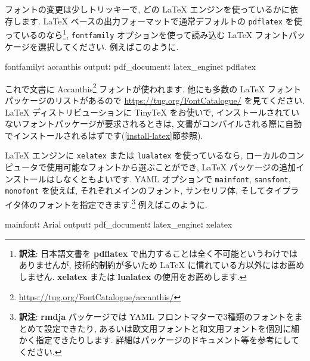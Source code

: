 \documentclass[
  11pt,
  lualatex,
  ja=standard]{bxjsreport}
\newenvironment{Shaded}{\begin{snugshade}}{\end{snugshade}}
\newcommand{\AttributeTok}[1]{\textcolor[rgb]{0.77,0.63,0.00}{#1}}
\newcommand{\FunctionTok}[1]{\textcolor[rgb]{0.00,0.00,0.00}{#1}}
\newcommand{\KeywordTok}[1]{\textcolor[rgb]{0.13,0.29,0.53}{\textbf{#1}}}
\renewcommand{\href}[2]{#2\footnote{\url{#1}}}
\begin{document}
フォントの変更は少しトリッキーで, どの LaTeX エンジンを使っているかに依存します. LaTeX ベースの出力フォーマットで通常デフォルトの \texttt{pdflatex} を使っているのなら\footnote{\textbf{訳注}: 日本語文書を \textbf{pdflatex} で出力することは全く不可能というわけではありませんが, 技術的制約が多いため LaTeX に慣れている方以外にはお薦めしません. \textbf{xelatex} または \textbf{lualatex} の使用をお薦めします.}, \texttt{fontfamily} オプションを使って読み込む LaTeX フォントパッケージを選択してください. 例えばこのように.

\begin{Shaded}
\begin{Highlighting}[]
\FunctionTok{fontfamily}\KeywordTok{:}\AttributeTok{ accanthis}
\FunctionTok{output}\KeywordTok{:}
\AttributeTok{  }\FunctionTok{pdf\_document}\KeywordTok{:}
\AttributeTok{    }\FunctionTok{latex\_engine}\KeywordTok{:}\AttributeTok{ pdflatex}
\end{Highlighting}
\end{Shaded}

これで文書に \href{https://tug.org/FontCatalogue/accanthis/}{Accanthis} フォントが使われます. 他にも多数の LaTeX フォントパッケージのリストがあるので \url{https://tug.org/FontCatalogue/} を見てください. LaTeX ディストリビューションに TinyTeX をお使いで, インストールされていないフォントパッケージが要求されるときは, 文書がコンパイルされる際に自動でインストールされるはずです(\ref{install-latex}節参照).

LaTeX エンジンに \texttt{xelatex} または \texttt{lualatex} を使っているなら, ローカルのコンピュータで使用可能なフォントから選ぶことができ, LaTeX パッケージの追加インストールはしなくともよいです. YAML オプションで \texttt{mainfont}, \texttt{sansfont}, \texttt{monofont} を使えば, それぞれメインのフォント, サンセリフ体, そしてタイプライタ体のフォントを指定できます.\footnote{\textbf{訳注}: \textbf{rmdja} パッケージでは YAML フロントマターで3種類のフォントをまとめて設定できたり, あるいは欧文用フォントと和文用フォントを個別に細かく指定できたりします. 詳細はパッケージのドキュメント等を参考にしてください.} 例えばこのように.

\begin{Shaded}
\begin{Highlighting}[]
\FunctionTok{mainfont}\KeywordTok{:}\AttributeTok{ Arial}
\FunctionTok{output}\KeywordTok{:}
\AttributeTok{  }\FunctionTok{pdf\_document}\KeywordTok{:}
\AttributeTok{    }\FunctionTok{latex\_engine}\KeywordTok{:}\AttributeTok{ xelatex}
\end{Highlighting}
\end{Shaded}
\end{document}
